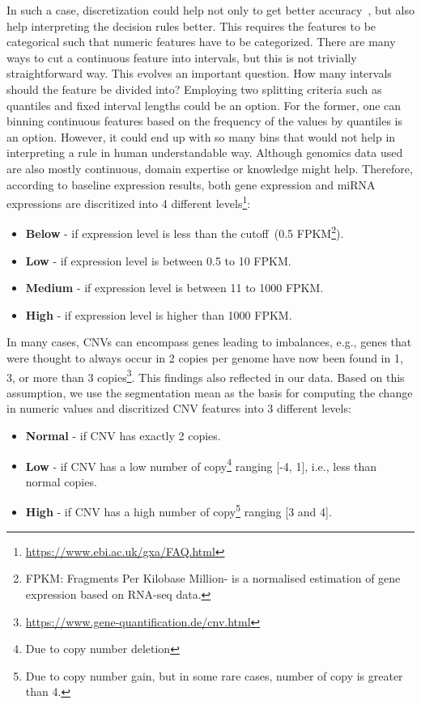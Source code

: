 \hspace*{3.5mm} In such a case, discretization could help not only to get better accuracy~\cite{maslove2013discretization}, but also help interpreting the decision rules better. This requires the features to be categorical such that numeric features have to be categorized. There are many ways to cut a continuous feature into intervals, but this is not trivially straightforward way. This evolves an important question. How many intervals should the feature be divided into? Employing two splitting criteria such as quantiles and fixed interval lengths could be an option. For the former, one can binning continuous features based on the frequency of the values by quantiles is an option. However, it could end up with so many bins that would not help in interpreting a rule in human understandable way. Although genomics data used are also mostly continuous, domain expertise or knowledge might help. Therefore, according to baseline expression results, both gene expression and miRNA expressions are discritized into 4 different levels\footnote{\url{https://www.ebi.ac.uk/gxa/FAQ.html}}:

\vspace{-2mm}
\begin{itemize}[noitemsep]
    \item \textbf{Below} - if expression level is less than the cutoff~(0.5 FPKM\footnote{FPKM: Fragments Per Kilobase Million- is a normalised estimation of gene expression based on RNA-seq data.}).
    \item \textbf{Low} - if expression level is between 0.5 to 10 FPKM.
    \item \textbf{Medium} - if expression level is between 11 to 1000 FPKM. 
    \item \textbf{High} - if expression level is higher than 1000 FPKM. 
\end{itemize}

\hspace*{3.5mm} In many cases, CNVs can encompass genes leading to imbalances, e.g., genes that were thought to always occur in 2 copies per genome have now been found in 1, 3, or more than 3  copies\footnote{\url{https://www.gene-quantification.de/cnv.html}}. This findings also reflected in our data. Based on this assumption, we use the segmentation mean as the basis for computing the change in numeric values and discritized CNV features into 3 different levels:  

\vspace{-2mm}
\begin{itemize}[noitemsep]
    \item \textbf{Normal} - if CNV has exactly 2 copies.
    \item\textbf{Low} - if CNV has a low number of copy\footnote{Due to copy number deletion} ranging [-4, 1], i.e., less than normal copies.
    \item\textbf{High} - if CNV has a high number of copy\footnote{Due to copy number gain, but in some rare cases, number of copy is greater than 4.} ranging [3 and 4].  %
\end{itemize}
\vspace{-2mm}

